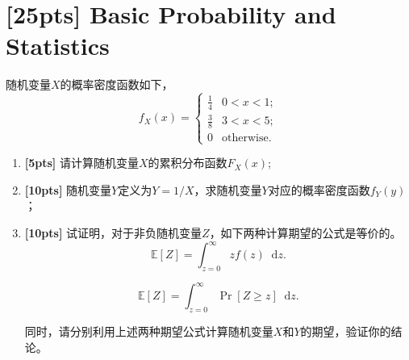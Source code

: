 \documentclass[a4paper,UTF8]{article}
\numberwithin{equation}{section}
\newcommand*\diff{\mathop{}\!\mathrm{d}}
\begin{document}
\section{[25pts] Basic Probability and Statistics}
随机变量$X$的概率密度函数如下，
\begin{equation}
	f_X(x) = 
	\begin{cases}
		\frac{1}{4} & 0<x<1;\\
		\frac{3}{8} & 3<x<5;\\
		0			& \mbox{otherwise.}
	\end{cases}
\end{equation}
\begin{enumerate}[ {(}1{)}]
\item \textbf{[5pts]} 请计算随机变量$X$的累积分布函数$F_X(x)$;
\item \textbf{[10pts]} 随机变量$Y$定义为$Y = 1/X$，求随机变量$Y$对应的概率密度函数$f_Y(y)$；
\item \textbf{[10pts]} 试证明，对于非负随机变量$Z$，如下两种计算期望的公式是等价的。
\begin{equation}
	\label{eq-expect-1}
	\mathbb{E}[Z] = \int_{z=0}^{\infty}zf(z) \diff z.
\end{equation}

\begin{equation}
	\label{eq-expect-2}
	\mathbb{E}[Z] = \int_{z=0}^{\infty}\Pr[Z\geq z] \diff z.
\end{equation}

同时，请分别利用上述两种期望公式计算随机变量$X$和$Y$的期望，验证你的结论。
\end{enumerate}
\end{document}
